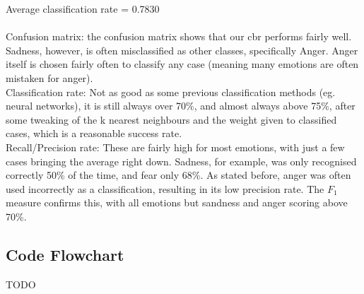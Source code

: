 \documentclass[12pt]{article}
\begin{document}
Average classification rate = 0.7830 \\ \\

Confusion matrix: the confusion matrix shows that our cbr performs fairly well. Sadness, however, is often misclassified as other classes, specifically Anger. Anger itself is chosen fairly often to classify any case (meaning many emotions are often mistaken for anger). \\
Classification rate: Not as good as some previous classification methods (eg. neural networks), it is still always over 70\%, and almost always above 75\%, after some tweaking of the k nearest neighbours and the weight given to classified cases, which is a reasonable success rate. \\
Recall/Precision rate: These are fairly high for most emotions, with just a few cases bringing the average right down. Sadness, for example, was only recognised correctly 50\% of the time, and fear only 68\%. As stated before, anger was often used incorrectly as a classification, resulting in its low precision rate. The $F_1$ measure confirms this, with all emotions but sandness and anger scoring above 70\%. \\

\newpage
\subsection*{Code Flowchart}

TODO
\end{document}
